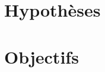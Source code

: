 

  \section{Hypothèses}
  \label{sec:main-introduction-hypothesis}


  \section{Objectifs}
  \label{sec:main-introduction-goals}

